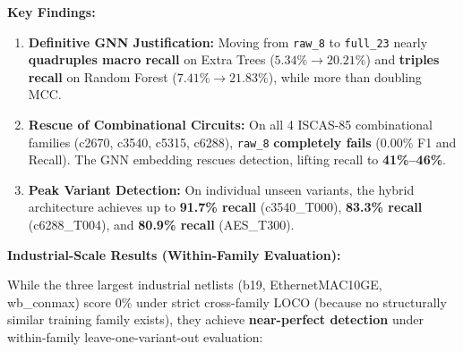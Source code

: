 \documentclass[11pt,a4paper]{article}
\begin{document}
\textbf{Key Findings:}
\begin{enumerate}[leftmargin=*]
    \item \textbf{Definitive GNN Justification:} Moving from \texttt{raw\_8} to \texttt{full\_23} nearly \textbf{quadruples macro recall} on Extra Trees ($5.34\% \to 20.21\%$) and \textbf{triples recall} on Random Forest ($7.41\% \to 21.83\%$), while more than doubling MCC.
    \item \textbf{Rescue of Combinational Circuits:} On all 4 ISCAS-85 combinational families (c2670, c3540, c5315, c6288), \texttt{raw\_8} \textbf{completely fails} ($0.00\%$ F1 and Recall). The GNN embedding rescues detection, lifting recall to \textbf{41\%--46\%}.
    \item \textbf{Peak Variant Detection:} On individual unseen variants, the hybrid architecture achieves up to \textbf{91.7\% recall} (c3540\_T000), \textbf{83.3\% recall} (c6288\_T004), and \textbf{80.9\% recall} (AES\_T300).
\end{enumerate}

\textbf{Industrial-Scale Results (Within-Family Evaluation):}

While the three largest industrial netlists (b19, EthernetMAC10GE, wb\_conmax) score 0\% under strict cross-family LOCO (because no structurally similar training family exists), they achieve \textbf{near-perfect detection} under within-family leave-one-variant-out evaluation:
\end{document}
